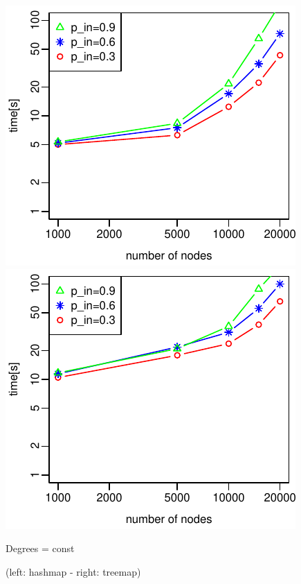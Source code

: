 \documentclass{article}
\begin{document}
\includegraphics{test_series_p_in_const_hashmap.pdf}
\includegraphics{test_series_p_in_const_treemap.pdf}

Degrees = const

(left: hashmap - right: treemap)
\end{document}
